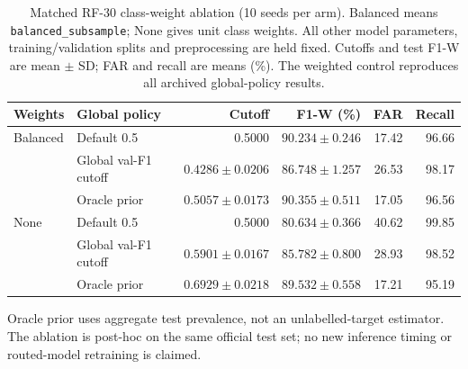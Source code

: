 \begin{table}[!htbp]
\centering
\caption{Matched RF-30 class-weight ablation (10 seeds per arm). Balanced means \texttt{balanced\_subsample}; None gives unit class weights. All other model parameters, training/validation splits and preprocessing are held fixed. Cutoffs and test F1-W are mean $\pm$ SD; FAR and recall are means (\%). The weighted control reproduces all archived global-policy results.}
\label{tab:classweight}
\small
\setlength{\tabcolsep}{4pt}
\begin{tabularx}{\textwidth}{@{}lXrrrr@{}}
\toprule
Weights & Global policy & Cutoff & F1-W (\%) & FAR & Recall \\
\midrule
Balanced & Default 0.5 & 0.5000 & $90.234\pm0.246$ & 17.42 & 96.66 \\
 & Global val-F1 cutoff & $0.4286\pm0.0206$ & $86.748\pm1.257$ & 26.53 & 98.17 \\
 & Oracle prior & $0.5057\pm0.0173$ & $90.355\pm0.511$ & 17.05 & 96.56 \\
\midrule
None & Default 0.5 & 0.5000 & $80.634\pm0.366$ & 40.62 & 99.85 \\
 & Global val-F1 cutoff & $0.5901\pm0.0167$ & $85.782\pm0.800$ & 28.93 & 98.52 \\
 & Oracle prior & $0.6929\pm0.0218$ & $89.532\pm0.558$ & 17.21 & 95.19 \\
\bottomrule
\end{tabularx}
\par\smallskip
\begin{minipage}{\textwidth}\footnotesize Oracle prior uses aggregate test prevalence, not an unlabelled-target estimator. The ablation is post-hoc on the same official test set; no new inference timing or routed-model retraining is claimed.\end{minipage}
\end{table}
